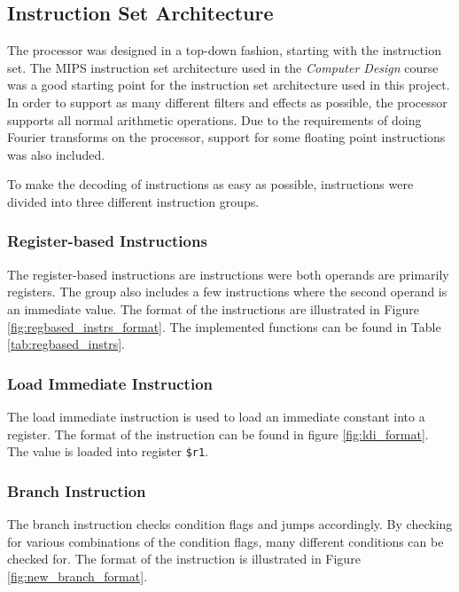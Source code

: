 \subsection{Instruction Set Architecture}\label{section:fpga-isa}

The processor was designed in a top-down fashion, starting with the instruction
set. The MIPS instruction set architecture used in the \textit{Computer
Design}\cite{tdt4255} course was a good starting point for the instruction set
architecture used in this project. In order to support as many different filters
and effects as possible, the processor supports all normal arithmetic
operations. Due to the requirements of doing Fourier transforms on the
processor, support for some floating point instructions was also included.

To make the decoding of instructions as easy as possible, instructions
were divided into three different instruction groups.

\subsubsection{Register-based Instructions}

The register-based instructions are instructions were both operands are
primarily registers. The group also includes a few instructions where
the second operand is an immediate value. The format of the
instructions are illustrated in Figure \ref{fig:regbased_instrs_format}. The
implemented functions can be found in Table \ref{tab:regbased_instrs}.


\FloatBarrier

\FloatBarrier

\subsubsection{Load Immediate Instruction}
The load immediate instruction is used to load an immediate constant into a
register. The format of the instruction can be found in figure
\ref{fig:ldi_format}. The value is loaded into register \texttt{\$r1}.


\FloatBarrier

\subsubsection{Branch Instruction}
The branch instruction checks condition flags and jumps accordingly. By
checking for various combinations of the condition flags, many different
conditions can be checked for. The format of the instruction is illustrated
in Figure \ref{fig:new_branch_format}.

